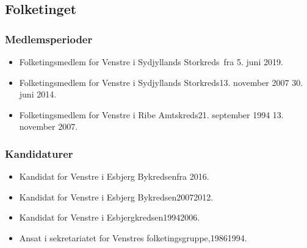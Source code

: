 \documentclass[11pt, a4paper]{awesome-cv}
\begin{document}
\begin{cvletter}
\subsection*{Folketinget}
\subsubsection*{Medlemsperioder}
\begin{itemize}
\item Folketingsmedlem for Venstre i Sydjyllands Storkreds fra 5. juni 2019.
\item Folketingsmedlem for Venstre i Sydjyllands Storkreds13. november 2007  30. juni 2014.
\item Folketingsmedlem for Venstre i Ribe Amtskreds21. september 1994  13. november 2007.
\end{itemize}
\subsubsection*{Kandidaturer}
\begin{itemize}
\item Kandidat for Venstre i Esbjerg Bykredsenfra 2016.
\item Kandidat for Venstre i Esbjerg Bykredsen20072012.
\item Kandidat for Venstre i Esbjergkredsen19942006.
\end{itemize}
\begin{itemize}
\item Ansat i sekretariatet for Venstres folketingsgruppe,19861994.
\end{itemize}
\end{cvletter}
\end{document}
